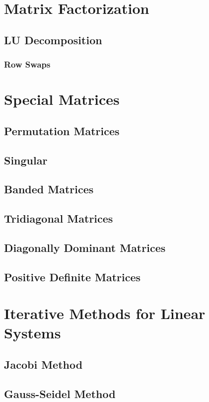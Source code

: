 \documentclass[8pt, letterpaper]{extarticle}
\begin{document}
\begin{multicols*}{3}
\begin{itemize}
      
  \end{itemize}

  \section{Matrix Factorization}
  \subsection{LU Decomposition}
  \subsubsection{Row Swaps}
  \section{Special Matrices}
  \subsection{Permutation Matrices}
  \subsection{Singular}
  \subsection{Banded Matrices}
  \subsection{Tridiagonal Matrices}
  \subsection{Diagonally Dominant Matrices}
  \subsection{Positive Definite Matrices} %

  \section{Iterative Methods for Linear Systems}
  \subsection{Jacobi Method}
  \subsection{Gauss-Seidel Method}

\end{multicols*}
\end{document}

